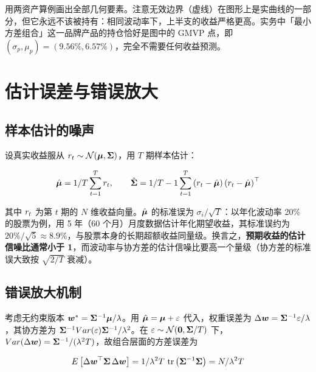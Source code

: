  用两资产算例画出全部几何要素。注意无效边界（虚线）在图形上是实曲线的一部分，但它永远不该被持有：相同波动率下，上半支的收益严格更高。实务中「最小方差组合」这一品牌产品的持仓恰好是图中的 GMVP 点，即 $(\sigma_p,\mu_p) = (9.56\%, 6.57\%)$，完全不需要任何收益预测。

\section{估计误差与错误放大}\label{sec:11-estimation-error}

\subsection{样本估计的噪声}

设真实收益服从 $r_t \sim \mathcal{N}(\bm{\mu}, \bm{\Sigma})$，用 $T$ 期样本估计：

\begin{equation}\label{eq:11-sample}
  \hat{\bm{\mu}} = 1/T\sum_{t=1}^{T}r_t, \qquad
  \hat{\bm{\Sigma}} = 1/T-1\sum_{t=1}^{T}\left(r_t - \hat{\bm{\mu}}\right)\left(r_t - \hat{\bm{\mu}}\right)^{\top}
\end{equation}

其中 $r_t$ 为第 $t$ 期的 $N$ 维收益向量。$\hat{\bm{\mu}}$ 的标准误为 $\sigma_i/\sqrt{T}$：以年化波动率 20\% 的股票为例，用 5 年（60 个月）月度数据估计年化期望收益，其标准误约为 $20\%/\sqrt{5} \approx 8.9\%$，与股票本身的长期超额收益同量级。换言之，\textbf{预期收益的估计信噪比通常小于 1}，而波动率与协方差的估计信噪比要高一个量级（协方差的标准误大致按 $\sqrt{2/T}$ 衰减）。

\subsection{错误放大机制}

考虑无约束版本 $\bm{w}^{*} = \bm{\Sigma}^{-1}\bm{\mu}/\lambda$。用 $\hat{\bm{\mu}} = \bm{\mu} + \varepsilon$ 代入，权重误差为 $\Delta\bm{w} = \bm{\Sigma}^{-1}\varepsilon/\lambda$，其协方差为 $\bm{\Sigma}^{-1}Var(\varepsilon)\bm{\Sigma}^{-1}/\lambda^{2}$。在 $\varepsilon \sim \mathcal{N}(\mathbf{0}, \bm{\Sigma}/T)$ 下，$Var(\Delta\bm{w}) = \bm{\Sigma}^{-1}/(\lambda^{2}T)$，故组合层面的方差误差为

\begin{equation}\label{eq:11-amplify}
  E\left[\Delta\bm{w}^{\top}\bm{\Sigma}\,\Delta\bm{w}\right]
  = 1/\lambda^{2}T\,\operatorname{tr}\left(\bm{\Sigma}^{-1}\bm{\Sigma}\right) = N/\lambda^{2}T
\end{equation}

